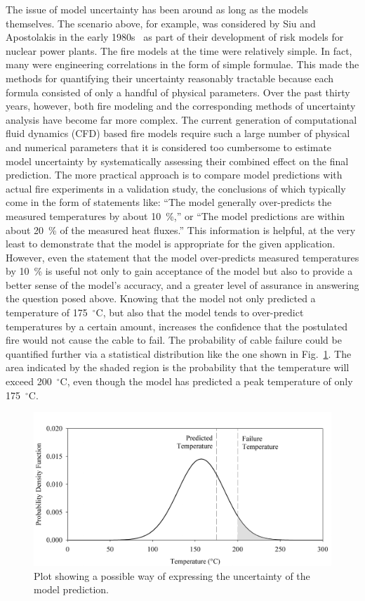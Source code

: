 The issue of model uncertainty has been around as long as the models themselves. The scenario above, for example, was considered by Siu and Apostolakis in the early 1980s~\cite{Siu:RE1982} as part of their development of risk models for nuclear power plants. The fire models at the time were relatively simple. In fact, many were engineering correlations in the form of simple formulae. This made the methods for quantifying their uncertainty reasonably tractable because each formula consisted of only a handful of physical parameters. Over the past thirty years, however, both fire modeling and the corresponding methods of uncertainty analysis have become far more complex. The current generation of computational fluid dynamics (CFD) based fire models require such a large number of physical and numerical parameters that it is considered too cumbersome to estimate model uncertainty by systematically assessing their combined effect on the final prediction. The more practical approach is to compare model predictions with actual fire experiments in a validation study, the conclusions of which typically come in the form of statements like: ``The model generally over-predicts the measured temperatures by about 10~\%,'' or ``The model predictions are within about 20~\% of the measured heat fluxes.'' This information is helpful, at the very least to demonstrate that the model is appropriate for the given application. However, even the statement that the model over-predicts measured temperatures by 10~\% is useful not only to gain acceptance of the model but also to provide a better sense of the model's accuracy, and a greater level of assurance in answering the question posed above. Knowing that the model not only predicted a temperature of 175~$^\circ$C, but also that the model tends to over-predict temperatures by a certain amount, increases the confidence that the postulated fire would not cause the cable to fail. The probability of cable failure could be quantified further via a statistical distribution like the one shown in Fig.~\ref{bell_curve}. The area indicated by the shaded region is the probability that the temperature will exceed 200~$^\circ$C, even though the model has predicted a peak temperature of only 175~$^\circ$C.
\begin{figure}[ht]
\begin{center}
\includegraphics[width=5.in]{FIGURES/bell_curve}
\end{center}
\caption[Demonstration of model uncertainty.]{Plot showing a possible way of expressing the uncertainty of the model prediction.}
\label{bell_curve}
\end{figure}

